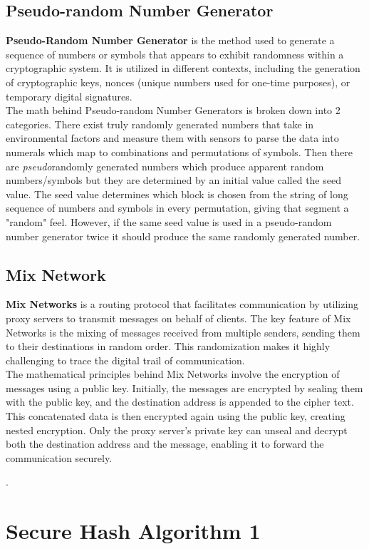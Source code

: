 \documentclass[12pt]{extarticle}
\begin{document}
\subsection{Pseudo-random Number Generator}
 \textbf{Pseudo-Random Number Generator} is the method used to generate a sequence of numbers or symbols that appears to exhibit randomness within a cryptographic system. It is utilized in different contexts, including the generation of cryptographic keys, nonces (unique numbers used for one-time purposes), or temporary digital signatures.\cite{src7}\\
The math behind Pseudo-random Number Generators is broken down into 2 categories. There exist truly randomly generated numbers that take in environmental factors and measure them with sensors to parse the data into numerals which map to combinations and permutations of symbols. Then there are {\slshape{pseudo}}randomly generated numbers which produce apparent random numbers/symbols but they are determined by an initial value called the seed value. The seed value determines which block is chosen from the string of long sequence of numbers and symbols in every permutation, giving that segment a "random" feel. However, if the same seed value is used in a pseudo-random number generator twice it should produce the same randomly generated number.
\subsection{Mix Network}
\textbf{Mix Networks} is a routing protocol that facilitates communication by utilizing proxy servers to transmit messages on behalf of clients. The key feature of Mix Networks is the mixing of messages received from multiple senders, sending them to their destinations in random order. This randomization makes it highly challenging to trace the digital trail of communication.\cite{src7}\\

The mathematical principles behind Mix Networks involve the encryption of messages using a public key. Initially, the messages are encrypted by sealing them with the public key, and the destination address is appended to the cipher text. This concatenated data is then encrypted again using the public key, creating nested encryption. Only the proxy server's private key can unseal and decrypt both the destination address and the message, enabling it to forward the communication securely.

.
\section{Secure Hash Algorithm 1}
\end{document}
